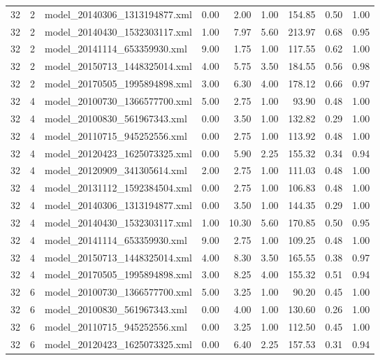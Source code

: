 \begin{table}[ht]
\begin{tabular}{rrlrrrrrr}
   32 &   2 & model\_20140306\_1313194877.xml & 0.00 & 2.00 & 1.00 & 154.85 & 0.50 & 1.00 \\ 
   32 &   2 & model\_20140430\_1532303117.xml & 1.00 & 7.97 & 5.60 & 213.97 & 0.68 & 0.95 \\ 
   32 &   2 & model\_20141114\_653359930.xml & 9.00 & 1.75 & 1.00 & 117.55 & 0.62 & 1.00 \\ 
   32 &   2 & model\_20150713\_1448325014.xml & 4.00 & 5.75 & 3.50 & 184.55 & 0.56 & 0.98 \\ 
   32 &   2 & model\_20170505\_1995894898.xml & 3.00 & 6.30 & 4.00 & 178.12 & 0.66 & 0.97 \\ 
   32 &   4 & model\_20100730\_1366577700.xml & 5.00 & 2.75 & 1.00 & 93.90 & 0.48 & 1.00 \\ 
   32 &   4 & model\_20100830\_561967343.xml & 0.00 & 3.50 & 1.00 & 132.82 & 0.29 & 1.00 \\ 
   32 &   4 & model\_20110715\_945252556.xml & 0.00 & 2.75 & 1.00 & 113.92 & 0.48 & 1.00 \\ 
   32 &   4 & model\_20120423\_1625073325.xml & 0.00 & 5.90 & 2.25 & 155.32 & 0.34 & 0.94 \\ 
   32 &   4 & model\_20120909\_341305614.xml & 2.00 & 2.75 & 1.00 & 111.03 & 0.48 & 1.00 \\ 
   32 &   4 & model\_20131112\_1592384504.xml & 0.00 & 2.75 & 1.00 & 106.83 & 0.48 & 1.00 \\ 
   32 &   4 & model\_20140306\_1313194877.xml & 0.00 & 3.50 & 1.00 & 144.35 & 0.29 & 1.00 \\ 
   32 &   4 & model\_20140430\_1532303117.xml & 1.00 & 10.30 & 5.60 & 170.85 & 0.50 & 0.95 \\ 
   32 &   4 & model\_20141114\_653359930.xml & 9.00 & 2.75 & 1.00 & 109.25 & 0.48 & 1.00 \\ 
   32 &   4 & model\_20150713\_1448325014.xml & 4.00 & 8.30 & 3.50 & 165.55 & 0.38 & 0.97 \\ 
   32 &   4 & model\_20170505\_1995894898.xml & 3.00 & 8.25 & 4.00 & 155.32 & 0.51 & 0.94 \\ 
   32 &   6 & model\_20100730\_1366577700.xml & 5.00 & 3.25 & 1.00 & 90.20 & 0.45 & 1.00 \\ 
   32 &   6 & model\_20100830\_561967343.xml & 0.00 & 4.00 & 1.00 & 130.60 & 0.26 & 1.00 \\ 
   32 &   6 & model\_20110715\_945252556.xml & 0.00 & 3.25 & 1.00 & 112.50 & 0.45 & 1.00 \\ 
   32 &   6 & model\_20120423\_1625073325.xml & 0.00 & 6.40 & 2.25 & 157.53 & 0.31 & 0.94 \\ 

\end{tabular}
\end{table}
